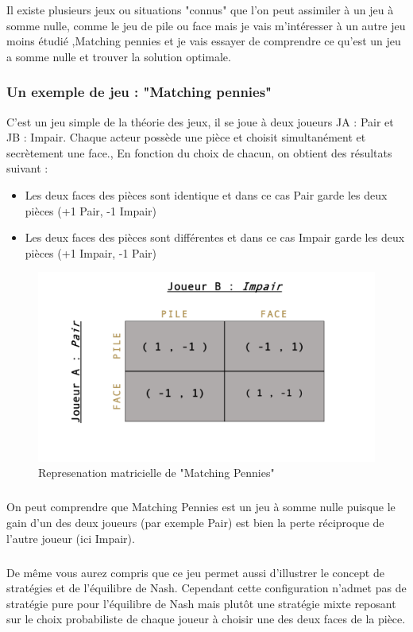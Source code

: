 \documentclass[a4paper, 12pt, twoside]{article}
\begin{document}
{Il existe plusieurs jeux ou situations "connus" que l'on peut assimiler à un \textsf{jeu à somme nulle}, comme le jeu de \textsf{pile ou face} mais je vais m'intéresser  à un autre jeu  moins étudié ,\textsf{Matching pennies} et je vais essayer de comprendre ce qu'est un \textsf{jeu a somme nulle} et trouver la solution optimale.

\subsubsection{Un exemple de jeu :  "Matching pennies"}
C'est un jeu simple de la théorie des jeux, il se joue à deux joueurs \textsf{JA} : \textsf{Pair}  et \textsf{JB} : \textsf{Impair}. Chaque acteur possède une pièce et choisit simultanément et secrètement une face., En fonction du choix de chacun, on obtient des résultats suivant :

\begin{itemize}
\item Les deux faces des pièces sont identique et dans ce cas Pair garde les deux pièces (+1 Pair, -1 Impair)
\item Les deux faces des pièces sont différentes et dans ce cas Impair garde les deux pièces (+1 Impair, -1 Pair)
\end{itemize}  \vspace{0.2 cm}

\begin{figure}[h!]
\centering
\includegraphics[scale=0.4]{Matching.pdf}
\caption{Represenation matricielle de "Matching Pennies"}
\end{figure} 

\subparagraph*{}{On peut comprendre que \textsf{Matching Pennies} est un jeu à somme nulle puisque le gain d'un des deux joueurs (par exemple Pair) est bien la perte réciproque de l'autre joueur (ici Impair).} 
\subparagraph*{}{De même vous aurez compris que ce jeu permet aussi d'illustrer le concept  de stratégies et de l'\textsf{équilibre de Nash}. Cependant cette configuration n'admet pas de stratégie pure pour l'\textsf{équilibre de Nash} mais plutôt une stratégie mixte reposant sur le choix probabiliste de chaque joueur à choisir une des deux faces de la pièce.}

}
\end{document}
